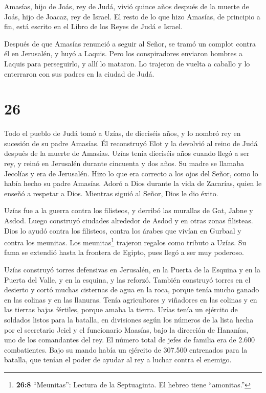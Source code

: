  Amasías, hijo de Joás, rey de Judá, vivió quince años
después de la muerte de Joás, hijo de Joacaz, rey de Israel.
 El resto de lo que hizo Amasías, de principio a fin, está
escrito en el Libro de los Reyes de Judá e Israel.

 Después de que Amasías renunció a seguir al Señor, se
tramó un complot contra él en Jerusalén, y huyó a Laquis. Pero los
conspiradores enviaron hombres a Laquis para perseguirlo, y allí lo
mataron.  Lo trajeron de vuelta a caballo y lo enterraron
con sus padres en la ciudad de Judá.

\hypertarget{section-25}{%
\section{26}\label{section-25}}

 Todo el pueblo de Judá tomó a Uzías, de dieciséis años, y
lo nombró rey en sucesión de su padre Amasías.  Él
reconstruyó Elot y la devolvió al reino de Judá después de la muerte de
Amasías.  Uzías tenía dieciséis años cuando llegó a ser rey,
y reinó en Jerusalén durante cincuenta y dos años. Su madre se llamaba
Jecolías y era de Jerusalén.  Hizo lo que era correcto a los
ojos del Señor, como lo había hecho su padre Amasías.  Adoró
a Dios durante la vida de Zacarías, quien le enseñó a respetar a Dios.
Mientras siguió al Señor, Dios le dio éxito.

 Uzías fue a la guerra contra los filisteos, y derribó las
murallas de Gat, Jabne y Asdod. Luego construyó ciudades alrededor de
Asdod y en otras zonas filisteas.  Dios lo ayudó contra los
filisteos, contra los árabes que vivían en Gurbaal y contra los
meunitas.  Los meunitas\footnote{\textbf{26:8} ``Meunitas'':
  Lectura de la Septuaginta. El hebreo tiene ``amonitas.''} trajeron
regalos como tributo a Uzías. Su fama se extendió hasta la frontera de
Egipto, pues llegó a ser muy poderoso.

 Uzías construyó torres defensivas en Jerusalén, en la
Puerta de la Esquina y en la Puerta del Valle, y en la esquina, y las
reforzó.  También construyó torres en el desierto y cortó
muchas cisternas de agua en la roca, porque tenía mucho ganado en las
colinas y en las llanuras. Tenía agricultores y viñadores en las colinas
y en las tierras bajas fértiles, porque amaba la tierra. 
Uzías tenía un ejército de soldados listos para la batalla, en
divisiones según los números de la lista hecha por el secretario Jeiel y
el funcionario Maasías, bajo la dirección de Hananías, uno de los
comandantes del rey.  El número total de jefes de familia
era de 2.600 combatientes.  Bajo su mando había un ejército
de 307.500 entrenados para la batalla, que tenían el poder de ayudar al
rey a luchar contra el enemigo.

